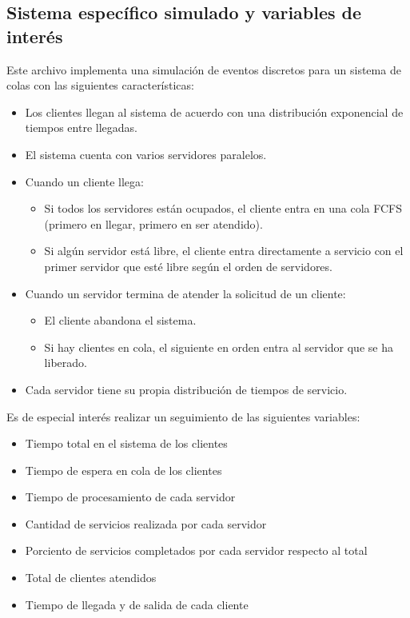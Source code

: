 \documentclass[12pt,a4paper]{article}
\begin{document}
\subsection{Sistema específico simulado y variables de interés}
Este archivo implementa una simulación de eventos discretos para un sistema de colas con las siguientes características:
\begin{itemize}
\item Los clientes llegan al sistema de acuerdo con una distribución exponencial de tiempos entre llegadas.
\item El sistema cuenta con varios servidores paralelos.
\item Cuando un cliente llega:
\begin{itemize}
\item Si todos los servidores están ocupados, el cliente entra en una cola FCFS (primero en llegar, primero en ser atendido).
\item Si algún servidor está libre, el cliente entra directamente a servicio con el primer servidor que esté libre según el orden de servidores.
\end{itemize}
\item Cuando un servidor termina de atender la solicitud de un cliente:
\begin{itemize}
\item El cliente abandona el sistema.
\item Si hay clientes en cola, el siguiente en orden entra al servidor que se ha liberado.
\end{itemize}
\item Cada servidor tiene su propia distribución de tiempos de servicio.
\end{itemize}

Es de especial interés realizar un seguimiento de las siguientes variables:
\begin{itemize}
\item Tiempo total en el sistema de los clientes
\item Tiempo de espera en cola de los clientes
\item Tiempo de procesamiento de cada servidor
\item Cantidad de servicios realizada por cada servidor
\item Porciento de servicios completados por cada servidor respecto al total
\item Total de clientes atendidos
\item Tiempo de llegada y de salida de cada cliente
\end{itemize}
\end{document}
